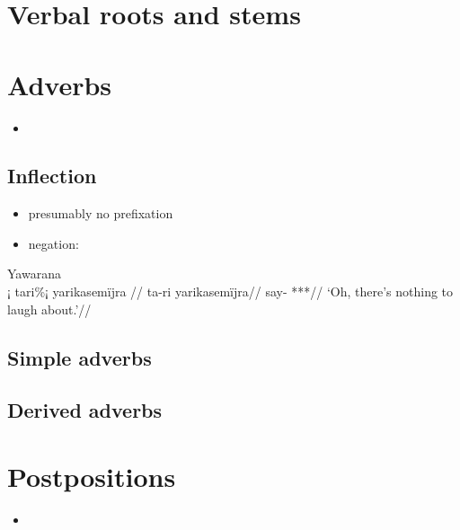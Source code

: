 \documentclass{memoir}
\begin{document}
\chapter{\texorpdfstring{Verbal roots and stems
\label{derbderiv}}{Verbal roots and stems }}

\chapter{\texorpdfstring{Adverbs \label{adverbs}}{Adverbs }}

\begin{itemize}
\tightlist
\item
\end{itemize}

\section{Inflection}

\begin{itemize}
\tightlist
\item
  presumably no prefixation
\item
  negation:
\end{itemize}

\ex Yawarana \\
\label{convrisamaj-52}    \begingl
    \glpreamble ¡ tari\%¡ yarikasemïjra //
    \gla ta-ri yarikasemïjra//
    \glb say- ***//
        \glft ‘Oh, there’s nothing to laugh about.’//  
    \endgl 
\xe

\section{\texorpdfstring{Simple adverbs
\label{sec:simpleadv}}{Simple adverbs }}

\section{\texorpdfstring{Derived adverbs
\label{sec:derivedadv}}{Derived adverbs }}

\chapter{\texorpdfstring{Postpositions \label{postp}}{Postpositions }}

\begin{itemize}
\tightlist
\item
\end{itemize}
\end{document}
